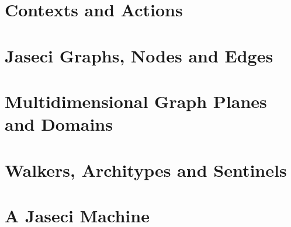 \chapter{Contexts and Actions}
\chapter{Jaseci Graphs, Nodes and Edges}
\chapter{Multidimensional Graph Planes and Domains}
\chapter{Walkers, Architypes and Sentinels}
\chapter{A Jaseci Machine}